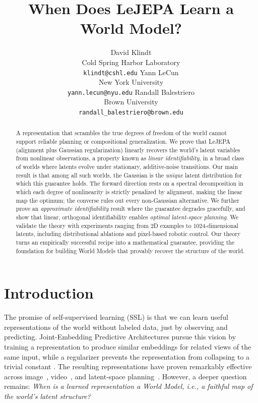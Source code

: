 \documentclass{article}
\title{When Does LeJEPA Learn a World Model?}
\author{%
  David Klindt \\
  Cold Spring Harbor Laboratory\\
  \texttt{klindt@cshl.edu}
  \And
  Yann LeCun \\
  New York University\\
  \texttt{yann.lecun@nyu.edu}
  \And
  Randall Balestriero\\
  Brown University\\
  \texttt{randall\_balestriero@brown.edu}
}
\begin{document}
\maketitle



\vspace{-10pt}
\begin{abstract}
\vspace{-10pt}
A representation that scrambles the true degrees of freedom of the world cannot support reliable planning or compositional generalization. We prove that LeJEPA (alignment plus Gaussian regularization) linearly recovers the world's latent variables from nonlinear observations, a property known as \textit{linear identifiability}, in a broad class of worlds where latents evolve under stationary, additive-noise transitions. Our main result is that among all such worlds, the Gaussian is the \textit{unique} latent distribution for which this guarantee holds. The forward direction rests on a spectral decomposition in which each degree of nonlinearity is strictly penalized by alignment, making the linear map the optimum; the converse rules out every non-Gaussian alternative. We further prove an \textit{approximate identifiability} result where the guarantee degrades gracefully, and show that linear, orthogonal identifiability enables \textit{optimal latent-space planning}. We validate the theory with experiments ranging from 2D examples to 1024-dimensional latents, including distributional ablations and pixel-based robotic control. Our theory turns an empirically successful recipe into a mathematical guarantee, providing the foundation for building World Models that provably recover the structure of the world.
\end{abstract}




\vspace{-15pt}
\section{Introduction}
\vspace{-10pt}
The promise of self-supervised learning (SSL) is that we can learn useful representations of the world without labeled data, just by observing and predicting. Joint-Embedding Predictive Architectures \citep[JEPAs,][]{lecun2022} pursue this vision by training a representation to produce similar embeddings for related views of the same input, while a regularizer prevents the representation from collapsing to a trivial constant \citep{balestriero2025lejepa, bardes2022}. The resulting representations have proven remarkably effective across image~\citep{assran2023ijepa}, video~\citep{bardes2024vjepa, assran2025vjepa2}, and latent-space planning~\citep{sobal2025pldm, zhou2025dinowm, maes2026leworldmodel}. However, a deeper question remains:
\emph{When is a learned representation a World Model, i.e., a faithful map of the world's latent structure?}
\end{document}
